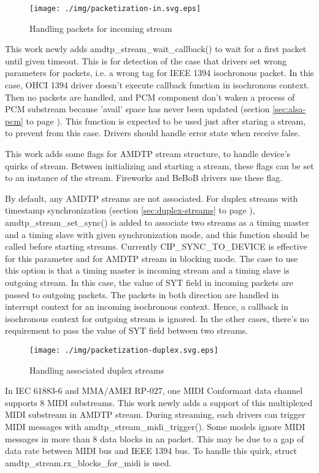 \documentclass[onecolumn]{article}
\begin{document}
\begin{figure}[H]
	\centering
	\texttt{[image: ./img/packetization-in.svg.eps]}
	\caption{{Handling packets for incoming stream}}
	\label{fig:packetization-in}
\end{figure}

This work newly adds amdtp\_stream\_wait\_callback() to wait for a first packet until given timeout. This is for detection of the case that drivers set wrong parameters for packets, i.e. a wrong tag for IEEE 1394 isochronous packet. In this case, OHCI 1394 driver doesn't execute callback function in isochronous context. Then no packets are handled, and PCM component don't waken a process of PCM substream because 'avail' space has never been updated (section \ref{sec:alsa-pcm} to page \pageref{sec:alsa-pcm}). This function is expected to be used just after staring a stream, to prevent from this case. Drivers should handle error state when receive false.

This work adds some flags for AMDTP stream structure, to handle device's quirks of stream. Between initializing and starting a stream, these flags can be set to an instance of the stream. Fireworks and BeBoB drivers use these flag.

By default, any AMDTP streams are not associated. For duplex streams with timestamp synchronization (section \ref{sec:duplex-streams} to page \pageref{sec:duplex-streams}), amdtp\_stream\_set\_sync() is added to associate two streams as a timing master and a timing slave with given synchronization mode, and this function should be called before starting streams. Currently CIP\_SYNC\_TO\_DEVICE is effective for this parameter and for AMDTP stream in blocking mode. The case to use this option is that a timing master is incoming stream and a timing slave is outgoing stream. In this case, the value of SYT field in incoming packets are passed to outgoing packets. The packets in both direction are handled in interrupt context for an incoming isochronous context. Hence, a callback in isochronous context for outgoing stream is ignored. In the other cases, there's no requirement to pass the value of SYT field between two streams.

\begin{figure}[H]
	\centering
	\texttt{[image: ./img/packetization-duplex.svg.eps]}
	\caption{{Handling associated duplex streams}}
	\label{fig:packetization-duplex}
\end{figure}


In IEC 61883-6\cite{iec61883-6-1, iec61883-6-2} and MMA/AMEI RP-027\cite{amei-rp27}, one MIDI Conformant data channel supports 8 MIDI substreams. This work newly adds a support of this multiplexed MIDI substream in AMDTP stream. During streaming, each drivers can trigger MIDI messages with amdtp\_stream\_midi\_trigger(). Some models ignore MIDI messages in more than 8 data blocks in an packet. This may be due to a gap of data rate between MIDI bus and IEEE 1394 bus. To handle this quirk, struct amdtp\_stream.rx\_blocks\_for\_midi is used.
\end{document}
